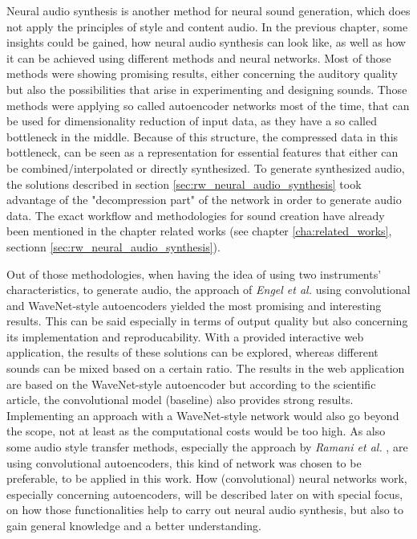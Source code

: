 Neural audio synthesis is another method for neural sound generation, which does not apply the principles of style and content audio. In the previous chapter, some insights could be gained, how neural audio synthesis can look like, as well as how it can be achieved using different methods and neural networks. Most of those methods were showing promising results, either concerning the auditory quality but also the possibilities that arise in experimenting and designing sounds. Those methods were applying so called autoencoder networks most of the time, that can be used for dimensionality reduction of input data, as they have a so called bottleneck in the middle. \cite{hinton2006autoencoder} Because of this structure, the compressed data in this bottleneck, can be seen as a representation for essential features that either can be combined/interpolated or directly synthesized. To generate synthesized audio, the solutions described in section \ref{sec:rw_neural_audio_synthesis} took advantage of the "decompression part" of the network in order to generate audio data. The exact workflow and methodologies for sound creation have already been mentioned in the chapter related works (see chapter \ref{cha:related_works}, sectionn \ref{sec:rw_neural_audio_synthesis}).

Out of those methodologies, when having the idea of using two instruments' characteristics, to generate audio, the approach of \textit{Engel et al.} \cite{Engel2017} using convolutional and WaveNet-style autoencoders yielded the most promising and interesting results. This can be said especially in terms of output quality but also concerning its implementation and reproducability. With a provided interactive web application, the results of these solutions can be explored, whereas different sounds can be mixed based on a certain ratio. The results in the web application are based on the WaveNet-style autoencoder but according to the scientific article, the convolutional model (baseline) also provides strong results. Implementing an approach with a WaveNet-style network would also go beyond the scope, not at least as the computational costs would be too high. As also some audio style transfer methods, especially the approach by \textit{Ramani et al.} \cite{Ramani2018}, are using convolutional autoencoders, this kind of network was chosen to be preferable, to be applied in this work. How (convolutional) neural networks work, especially concerning autoencoders, will be described later on  with special focus, on how those functionalities help to carry out neural audio synthesis, but also to gain general knowledge and a better understanding.

